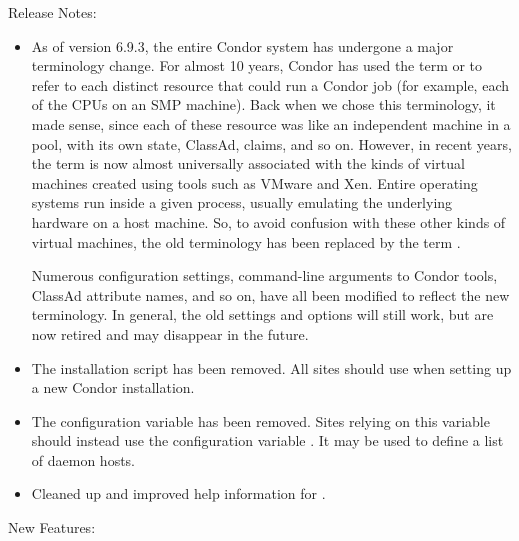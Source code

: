\noindent Release Notes:

\begin{itemize}

\item As of version 6.9.3, the entire Condor system has undergone a
  major terminology change.
  For almost 10 years, Condor has used the term 
  or  to refer to each distinct resource that could run a
  Condor job (for example, each of the CPUs on an SMP machine).
  Back when we chose this terminology, it made sense, since each of
  these resource was like an independent machine in a pool, with
  its own state, ClassAd, claims, and so on.
  However, in recent years, the term  is now
  almost universally associated with the kinds of virtual machines
  created using tools such as VMware and Xen.  Entire operating systems
  run inside a given process, usually emulating the underlying
  hardware on a host machine.
  So, to avoid confusion with these other kinds of virtual machines,
  the old   terminology has been replaced by
  the term .

  Numerous configuration settings, command-line arguments to Condor
  tools, ClassAd attribute names, and so on, have all been
  modified to reflect the new  terminology.
  In general, the old settings and options will still work, but are
  now retired and may disappear in the future.

\item The  installation script has
  been removed.
  All sites should use  when setting up a new Condor
  installation.

\item The  configuration variable has
  been removed.
  Sites relying on this variable should instead use the configuration
  variable . It may be used to
  define a list of  daemon hosts.

\item Cleaned up and improved help information for .

\end{itemize}


\noindent New Features:

